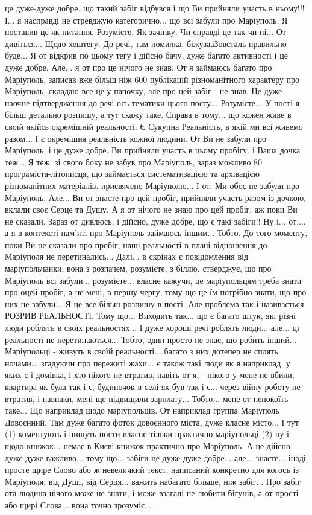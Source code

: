 це дуже-дуже добре. що такий забіг відбувся і що Ви прийняли участь в ньому!!!
І... я насправді не стревджую категорично... що всі забули про Маріуполь. Я
поставив це як питання. Розумієте. Як зачіпку. Чи справді це так чи ні... От
дивіться... Щодо хештегу. До речі, там помилка, біжузааЗовсталь правильно
буде... Я от відкрив по цьому тегу і дійсно бачу, дуже багато активності і це
дуже добре. Але... я от про це нічого не знав. От я займаюсь багато про
Маріуполь, записав вже більш ніж 600 публікацій різноманітного характеру про
Маріуполь, складаю все це у папочку, але про цей забіг - не знав. Це дуже
наочне підтвердження до речі ось тематики цього посту... Розумієте... У пості я
більш детально розпишу, а тут скажу таке. Справа в тому... що кожен живе в
своїй якійсь окремішній реальності. Є Сукупна Реальність, в якій ми всі живемо
разом... І є окремішня реальність кожної людини. От Ви не забули про Маріуполь,
і це дуже добре. Ви прийняли участь в цьому пробігу. і Ваша дочка теж... Я теж,
зі свого боку не забув про Маріуполь, зараз можливо 80%
програміста-літописця, що займається систематизацією та архівацією
різноманітних матеріалів. присвячено Маріуполю... І от. Ми обоє не забули про
Маріуполь. Але... Ви от знаєте про цей пробіг, прийняли участь разом із дочкою,
вклали своє Серце та Душу. А я от нічого не знаю про цей пробіг, аж поки Ви не
сказали. Зараз от дивлюсь, і дійсно, дуже добре, що є такі забіги!!  Ну і...
от.... а я в контексті пам'яті про Маріуполь займаюсь іншим... Тобто. До того
моменту, поки Ви не сказали про пробіг, наші реальності в плані відношення до
Маріуполя не перетинались... Далі... в скрінах є повідомлення від
маріупольчанки, вона з розпачем, розумієте, з біллю, стверджує, що про
Маріуполь всі забули... розумієте... власне кажучи, це маріупольцям треба знати
про оцей пробіг, а не мені, в першу чергу, тому що це їм потрібно знати, що про
них не забули... Я це все більш розпишу в пості. Але проблема так і називається
РОЗРИВ РЕАЛЬНОСТІ. Тому що... Виходить так... що є багато штук, які різні люди
роблять в своїх реальностях... І дуже хороші речі роблять люди... але... ці
реальності не перетинаються... Тобто, один просто не знає, що робить інший...
Маріупольці - живуть в своїй реальності... багато з них дотепер не сплять
ночами... згадуючи про пережиті жахи... є також такі люди як я наприклад, у
яких є і домівка, і хто нікого не втратив, навіть от я, - нікого у мене не
вбили, квартира як була так і є, будиночок в селі як був так і є... через війну
роботу не втратив, і навпаки, мені ще підвищили зарплату... Тобто... мене от
непокоїть таке... Що наприклад щодо маріупольців. От наприклад группа Маріуполь
Довоєнний. Там дуже багато фоток довоєнного міста, дуже класне місто... І тут
(1) коментують і пишуть пости власне тільки практично маріупольці (2) ну і щодо
книжок... немає в Києві книжок практично про Маріуполь. А це дійсно дуже-дуже
важливо... тому що... забіги це дуже-дуже добре... але... знаєте... іноді
просте щире Слово або ж невеличкий текст, написаний конкретно для когось із
Маріуполя, від Душі, від Серця... важить набагато більше, ніж забіг... Про
забіг ота людина нічого може не знати, і може взагалі не любити бігунів, а от
прості або щирі Слова... вона точно зрозуміє... 

